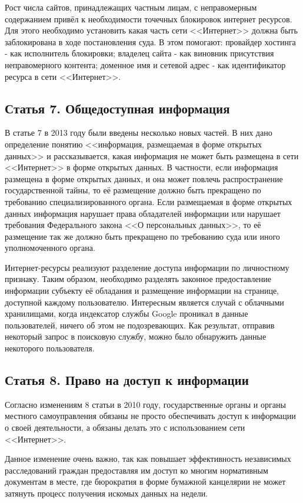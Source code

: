 Рост числа сайтов, принадлежащих частным лицам, с неправомерным содержанием привёл к необходимости точечных блокировок интернет ресурсов. Для этого необходимо установить какая часть сети <<Интернет>> должна быть заблокирована в ходе постановления суда. В этом помогают: провайдер хостинга - как исполнитель блокировки; владелец сайта - как виновник присутствия неправомерного контента; доменное имя и сетевой адрес - как идентификатор ресурса в сети <<Интернет>>.

\subsection{Статья 7. Общедоступная информация}

В статье 7 в 2013 году были введены несколько новых частей. В них дано определение понятию <<информация, размещаемая в форме открытых данных>> и рассказывается, какая информация не может быть размещена в сети <<Интернет>> в форме открытых данных. В частности, если информация размещена в форме открытых данных, и она может повлечь распространение государственной тайны, то её размещение должно быть прекращено по требованию специализированного органа. Если размещаемая в форме открытых данных информация нарушает права обладателей информации или нарушает требования Федерального закона <<О персональных данных>>, то её размещение так же должно быть прекращено по требованию суда или иного уполномоченного органа.


Интернет-ресурсы реализуют разделение доступа информации по личностному признаку. Таким образом, необходимо разделять законное предоставление информации субъекту её обладания и размещение информации на странице, доступной каждому пользователю. Интересным является случай с облачными хранилищами, когда индексатор службы Google проникал в данные пользователей, ничего об этом не подозревающих. Как результат, отправив некоторый запрос в поисковую службу, можно было обнаружить данные некоторого пользователя.

\subsection{Статья 8. Право на доступ к информации}

Согласно изменениям 8 статьи в 2010 году, государственные органы и органы местного самоуправления обязаны не просто обеспечивать доступ к информации о своей деятельности, а обязаны делать это с использованием сети <<Интернет>>.


Данное изменение очень важно, так как повышает эффективность независимых расследований граждан предоставляя им доступ ко многим нормативным документам в месте, где бюрократия в форме бумажной канцелярии не может затянуть процесс получения искомых данных на недели.

